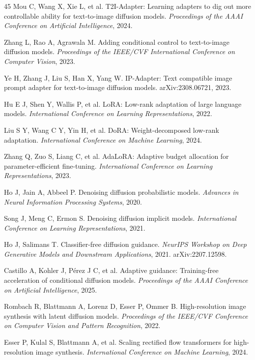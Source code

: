 \documentclass[times,twocolumn,final]{elsarticle}
\begin{document}
\begin{thebibliography}{45}
Mou C, Wang X, Xie L, et al. T2I-Adapter: Learning adapters to dig out more controllable ability for text-to-image diffusion models. \textit{Proceedings of the AAAI Conference on Artificial Intelligence}, 2024.

Zhang L, Rao A, Agrawala M. Adding conditional control to text-to-image diffusion models. \textit{Proceedings of the IEEE/CVF International Conference on Computer Vision}, 2023.

Ye H, Zhang J, Liu S, Han X, Yang W. IP-Adapter: Text compatible image prompt adapter for text-to-image diffusion models. arXiv:2308.06721, 2023.

Hu E J, Shen Y, Wallis P, et al. LoRA: Low-rank adaptation of large language models. \textit{International Conference on Learning Representations}, 2022.

Liu S Y, Wang C Y, Yin H, et al. DoRA: Weight-decomposed low-rank adaptation. \textit{International Conference on Machine Learning}, 2024.

Zhang Q, Zuo S, Liang C, et al. AdaLoRA: Adaptive budget allocation for parameter-efficient fine-tuning. \textit{International Conference on Learning Representations}, 2023.

Ho J, Jain A, Abbeel P. Denoising diffusion probabilistic models. \textit{Advances in Neural Information Processing Systems}, 2020.

Song J, Meng C, Ermon S. Denoising diffusion implicit models. \textit{International Conference on Learning Representations}, 2021.

Ho J, Salimans T. Classifier-free diffusion guidance. \textit{NeurIPS Workshop on Deep Generative Models and Downstream Applications}, 2021. arXiv:2207.12598.

Castillo A, Kohler J, P\'erez J C, et al. Adaptive guidance: Training-free acceleration of conditional diffusion models. \textit{Proceedings of the AAAI Conference on Artificial Intelligence}, 2025.

Rombach R, Blattmann A, Lorenz D, Esser P, Ommer B. High-resolution image synthesis with latent diffusion models. \textit{Proceedings of the IEEE/CVF Conference on Computer Vision and Pattern Recognition}, 2022.

Esser P, Kulal S, Blattmann A, et al. Scaling rectified flow transformers for high-resolution image synthesis. \textit{International Conference on Machine Learning}, 2024.


\end{thebibliography}
\end{document}
